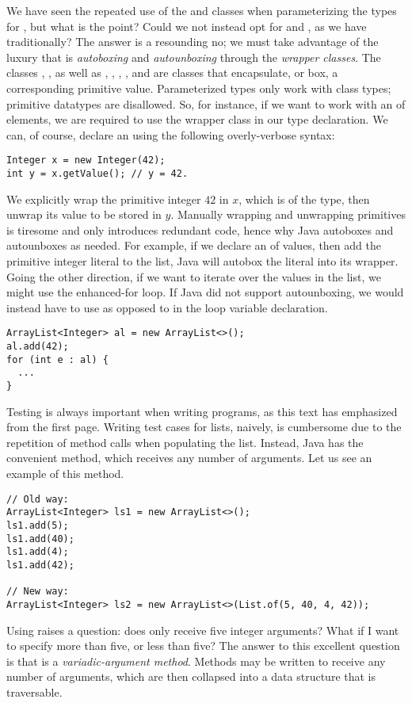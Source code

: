 We have seen the repeated use of the  and  classes when parameterizing the types for , but what is the point? Could we not instead opt for  and , as we have traditionally? The answer is a resounding no; we must take advantage of the luxury that is \textit{autoboxing} and \textit{autounboxing} through the \textit{wrapper classes}. The classes , , as well as , , , , and  are classes that encapsulate, or box, a corresponding primitive value. Parameterized types only work with class types; primitive datatypes are disallowed. So, for instance, if we want to work with an  of  elements, we are required to use the  wrapper class in our type declaration. We can, of course, declare an  using the following overly-verbose syntax:
\par{
\begin{verbatim}
Integer x = new Integer(42);
int y = x.getValue(); // y = 42.
\end{verbatim}
}
We explicitly wrap the primitive integer $42$ in $x$, which is of the  type, then unwrap its value to be stored in $y$. Manually wrapping and unwrapping primitives is tiresome and only introduces redundant code, hence why Java autoboxes and autounboxes as needed. For example, if we declare an  of  values, then add the primitive integer literal  to the list, Java will autobox the literal into its  wrapper. Going the other direction, if we want to iterate over the values in the list, we might use the enhanced-for loop. If Java did not support autounboxing, we would instead have to use  as opposed to  in the loop variable declaration. 
\par{
\begin{verbatim}
ArrayList<Integer> al = new ArrayList<>();
al.add(42);
for (int e : al) {
  ...
}
\end{verbatim}
}

Testing is always important when writing programs, as this text has emphasized from the first page. Writing test cases for lists, naively, is cumbersome due to the repetition of  method calls when populating the list. Instead, Java has the convenient  method, which receives any number of arguments. Let us see an example of this method.

\par{
\begin{verbatim}
// Old way:
ArrayList<Integer> ls1 = new ArrayList<>();
ls1.add(5);
ls1.add(40);
ls1.add(4);
ls1.add(42);

// New way:
ArrayList<Integer> ls2 = new ArrayList<>(List.of(5, 40, 4, 42));
\end{verbatim}
}
Using  raises a question: does  only receive five integer arguments? What if I want to specify more than five, or less than five? The answer to this excellent question is that  is a \textit{variadic-argument method}. Methods may be written to receive any number of arguments, which are then collapsed into a data structure that is traversable.

